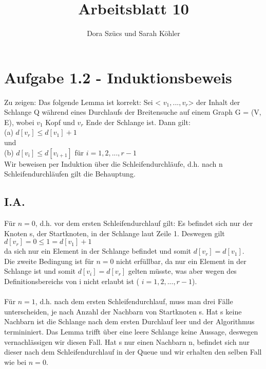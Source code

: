 \documentclass[11pt, oneside]{article}   	%
\title{Arbeitsblatt 10}
\author{Dora Szücs und Sarah Köhler}
\date{}							%
\begin{document}
\maketitle

\section*{Aufgabe 1.2 - Induktionsbeweis}
Zu zeigen: Das folgende Lemma ist korrekt:
Sei < $v_1, ...,  v_r$> der Inhalt der Schlange Q während eines Durchlaufs der Breitensuche auf einem Graph G = (V, E), wobei $v_1$ Kopf und $v_r$ Ende der Schlange ist. Dann gilt: \\
(a) $ d[v_r] \le d[v_1] + 1$ \\
und\\
(b) $ d[v_i] \le d[v_{i+1}]  $ für $ i = 1, 2, ..., r -1  $ \\

Wir beweisen per Induktion über die Schleifendurchläufe, d.h. nach n Schleifendurchläufen gilt die Behauptung.

\subsection*{I.A.}
Für $ n = 0$, d.h. vor dem ersten Schleifendurchlauf gilt:
Es befindet sich nur der Knoten s, der Startknoten, in der Schlange laut Zeile 1. Deswegen gilt \\
$ d[v_r] = 0 \le 1 = d[v_1] + 1$ \\
da sich nur ein Element in der Schlange befindet und somit $d[v_r] = d[v_1]$.
\\
Die zweite Bedingung ist für $n=0$ nicht erfüllbar, da nur ein Element in der Schlange ist und somit $d[v_i] = d[v_r] $ gelten müsste, was aber wegen des Definitionsbereichs von i nicht erlaubt ist ( $ i = 1, 2, ..., r -1  $).\\
 \\
Für $ n = 1$, d.h. nach dem ersten Schleifendurchlauf, muss man drei Fälle unterscheiden, je nach Anzahl der Nachbarn von Startknoten s. Hat s keine Nachbarn ist die Schlange nach dem ersten Durchlauf leer und der Algorithmus termininiert. Das Lemma trifft über eine leere Schlange keine Aussage, deswegen vernachlässigen wir diesen Fall. Hat s nur einen Nachbarn n, befindet sich nur dieser nach dem Schleifendurchlauf in der Queue und wir erhalten den selben Fall wie bei $ n = 0$.
\end{document}
